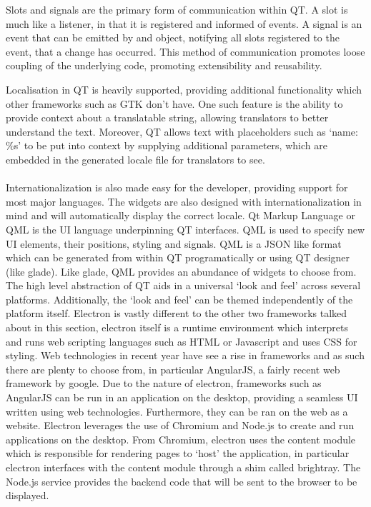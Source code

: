   Slots and signals are the primary form of communication within QT. A slot is much like a listener, in that it is registered and informed of events. A signal is an event that can be emitted by and object, notifying all slots registered to the event, that a change has occurred. This method of communication promotes loose coupling of the underlying code, promoting extensibility and reusability.

  Localisation in QT is heavily supported, providing additional functionality which other frameworks such as GTK don't have. One such feature is the ability to provide context about a translatable string, allowing translators to better understand the text. Moreover, QT allows text with placeholders such as `name: \%s' to be put into context by supplying additional parameters, which are embedded in the generated locale file for translators to see. \\\\
  Internationalization is also made easy for the developer, providing support for most major languages. The widgets are also designed with internationalization in mind and will automatically display the correct locale.
  Qt Markup Language or QML is the UI language underpinning QT interfaces. QML is used to specify new UI elements, their positions, styling and signals. QML is a JSON like format which can be generated from within QT programatically or using QT designer (like glade). Like glade, QML provides an abundance of widgets to choose from. The high level abstraction of QT aids in a universal `look and feel' across several platforms. Additionally, the `look and feel' can be themed independently of the platform itself.
Electron is vastly different to the other two frameworks talked about in this section, electron itself is a runtime environment which interprets and runs web scripting languages such as HTML or Javascript and uses CSS for styling. Web technologies in recent year have see a rise in frameworks and as such there are plenty to choose from, in particular AngularJS, a fairly recent web framework by google. Due to the nature of electron, frameworks such as AngularJS can be run in an application on the desktop, providing a seamless UI written using web technologies. Furthermore, they can be ran on the web as a website.
%
  Electron leverages the use of Chromium and Node.js to create and run applications on the desktop. From Chromium, electron uses the content module which is responsible for rendering pages to `host' the application, in particular electron interfaces with the content module through a shim called brightray. The Node.js service provides the backend code that will be sent to the browser to be displayed.\\\\
